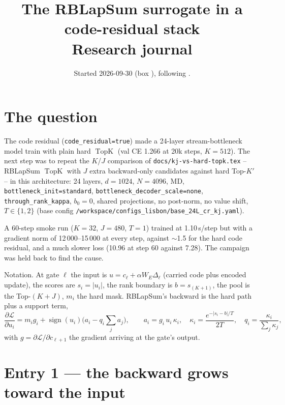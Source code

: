 \documentclass[11pt,a4paper]{article}
\title{
The RBLapSum surrogate in a code-residual stack\\[2pt]
\large Research journal
}
\author{}
\date{Started 2026-09-30 (box \code{lisbon}), following \code{docs/stream-bottleneck-depth-journal.tex}.}
\newcommand{\code}[1]{\texttt{#1}}
\newcommand{\topk}{\operatorname{TopK}}
\begin{document}
\maketitle
\vspace{-2em}
\tableofcontents

\section{The question}

The code residual (\code{code\_residual=true}) made a 24-layer stream-bottleneck model train with plain hard
\(\topk\) (val CE 1.266 at 20k steps, \(K=512\)).  The next step was to repeat the \(K\)/\(J\) comparison of
\code{docs/kj-vs-hard-topk.tex} -- RBLapSum \(\topk\) with \(J\) extra backward-only candidates against hard
Top-\(K'\) -- in this architecture: 24 layers, \(d=1024\), \(N=4096\), MD, \code{bottleneck\_init=standard},
\code{bottleneck\_decoder\_scale=none}, \code{through\_rank\_kappa}, \(b_0=0\), shared projections, no post-norm, no
value shift, \(T\in\{1,2\}\) (base config \code{/workspace/configs\_lisbon/base\_24L\_cr\_kj.yaml}).

A 60-step smoke run (\(K=32\), \(J=480\), \(T=1\)) trained at 1.10\,s/step but with a gradient norm of
12\,000--15\,000 at every step, against \(\sim\)1.5 for the hard code residual, and a much slower loss (10.96 at
step 60 against 7.28).  The campaign was held back to find the cause.

Notation.  At gate \(\ell\) the input is \(u=c_\ell+\alpha W_E\Delta_\ell\) (carried code plus encoded update), the
scores are \(s_i=|u_i|\), the rank boundary is \(b=s_{(K+1)}\), the pool is the Top-\((K+J)\), \(m_i\) the hard
mask.  RBLapSum's backward is the hard path plus a support term,
\begin{equation}
  \frac{\partial\mathcal L}{\partial u_i}=m_i g_i+\operatorname{sign}(u_i)\bigl(a_i-q_i\textstyle\sum_j a_j\bigr),
  \qquad a_i=g_i\,u_i\,\kappa_i,\quad \kappa_i=\frac{e^{-|s_i-b|/T}}{2T},\quad q_i=\frac{\kappa_i}{\sum_j\kappa_j},
  \label{eq:rbk}
\end{equation}
with \(g=\partial\mathcal L/\partial c_{\ell+1}\) the gradient arriving at the gate's output.

\section{Entry 1 --- the backward grows toward the input}
\end{document}
